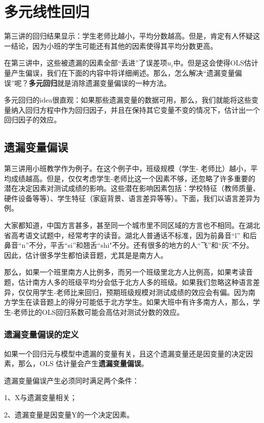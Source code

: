 \documentclass[cn,10pt,math=newtx,citestyle=gb7714-2015,bibstyle=gb7714-2015]{elegantbook}
\begin{document}
	\chapter{多元线性回归}

	第三讲的回归结果显示：学生老师比越小，平均分数越高。但是，肯定有人怀疑这一结论，因为小班的学生可能还有其他的因素使得其平均分数更高。
	
	在第三讲中，这些被遗漏的因素全部“丢进”了误差项$u_i$中。但是这会使得OLS估计量产生偏误，我们在下面的内容中将详细阐述。那么，怎么解决“遗漏变量偏误”呢？\textbf{多元回归}就是消除遗漏变量偏误的一种方法。
	
	多元回归的idea很直观：如果那些遗漏变量的数据可用，那么，我们就能将这些变量纳入回归方程中作为回归因子，并且在保持其它变量不变的情况下，估计出一个回归因子的效应。
	
	\section{遗漏变量偏误}
	第三讲用小班教学作为例子。在这个例子中，班级规模（学生- 老师比）越小，平均成绩越高。但是，仅仅考虑学生-老师比这一个因素不够，还忽略了许多重要的潜在决定因素对测试成绩的影响。这些潜在影响因素包括：学校特征（教师质量、硬件设备等等）、学生特征（家庭背景、语言差异等等）。下面，我们以语言差异为例。
	
	大家都知道，中国方言甚多，甚至同一个城市里不同区域的方言也不相同。在湖北省高考语文试题中，经常考字的读音。湖北人普通话不标准，因为前鼻音“l” 和后鼻音“n”不分，平舌“si”和翘舌“shi"不分。还有很多的地方的人“飞”和“灰”不分。因此，估计很多学生都怕读音题，尤其是是南方人。
	
	那么，如果一个班里南方人比例多，而另一个班级里北方人比例高，如果考读音题，估计南方人多的班级平均分会低于北方人多的班级。如果我们忽略这种语言差异，仅仅用学生-老师比来回归，预期班级规模对测试成绩的效应会有偏。因为南方学生在读音题上的得分可能低于北方学生。如果大班中有许多南方人，那么，学生-老师比的OLS回归系数可能会高估对测试分数的效应。
	
	\subsection{遗漏变量偏误的定义}
	如果一个回归元与模型中遗漏的变量有关，且这个遗漏变量还是因变量的决定因素，那么，OLS 估计量会产生\textbf{遗漏变量偏误}。
	
	遗漏变量偏误产生必须同时满足两个条件：
	
	1、X与遗漏变量相关；
	
	2、遗漏变量是因变量Y的一个决定因素。
	
\end{document}
